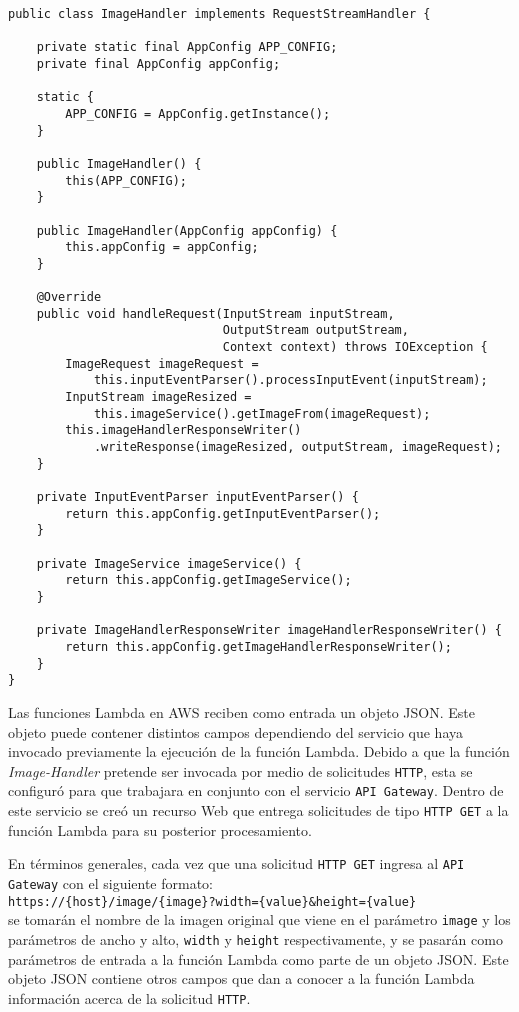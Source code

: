 \begin{lstlisting}[linewidth=16.5cm, caption={Clase \texttt{ImageHandler.java}}, label={lst:lambda-1}]
public class ImageHandler implements RequestStreamHandler {

    private static final AppConfig APP_CONFIG;
    private final AppConfig appConfig;

    static {
        APP_CONFIG = AppConfig.getInstance();
    }

    public ImageHandler() {
        this(APP_CONFIG);
    }

    public ImageHandler(AppConfig appConfig) {
        this.appConfig = appConfig;
    }

    @Override
    public void handleRequest(InputStream inputStream, 
                              OutputStream outputStream, 
                              Context context) throws IOException {
        ImageRequest imageRequest = 
            this.inputEventParser().processInputEvent(inputStream);
        InputStream imageResized = 
            this.imageService().getImageFrom(imageRequest);
        this.imageHandlerResponseWriter()
            .writeResponse(imageResized, outputStream, imageRequest);
    }

    private InputEventParser inputEventParser() {
        return this.appConfig.getInputEventParser();
    }

    private ImageService imageService() {
        return this.appConfig.getImageService();
    }

    private ImageHandlerResponseWriter imageHandlerResponseWriter() {
        return this.appConfig.getImageHandlerResponseWriter();
    }
}    
\end{lstlisting}


Las funciones Lambda en AWS reciben como entrada un objeto JSON. Este objeto puede contener distintos campos dependiendo del servicio que haya invocado previamente la ejecución de la función Lambda. Debido a que la función \emph{Image-Handler} pretende ser invocada por medio de solicitudes \texttt{HTTP}, esta se configuró para que trabajara en conjunto con el servicio \texttt{API Gateway}. Dentro de este servicio se creó un recurso Web que entrega solicitudes de tipo \texttt{HTTP GET} a la función Lambda para su posterior procesamiento.

En términos generales, cada vez que una solicitud \texttt{HTTP GET} ingresa al \texttt{API Gateway} con el siguiente formato:\\ \texttt{https://\{host\}/image/\{image\}?width=\{value\}\&height=\{value\}}\\ se tomarán el nombre de la imagen original que viene en el parámetro \texttt{image} y los parámetros de ancho y alto, \texttt{width} y \texttt{height} respectivamente, y se pasarán como parámetros de entrada a la función Lambda como parte de un objeto JSON. Este objeto JSON contiene otros campos que dan a conocer a la función Lambda información acerca de la solicitud \texttt{HTTP}.

